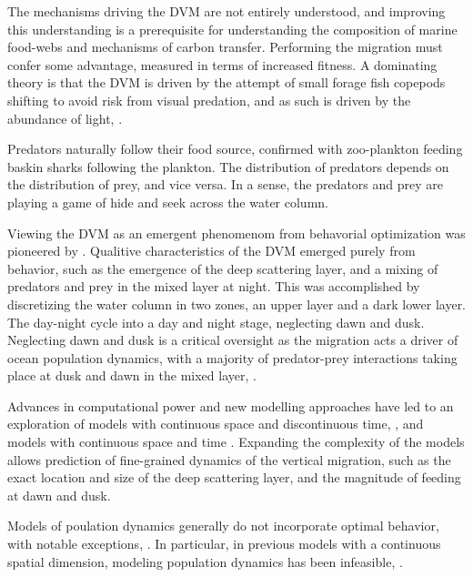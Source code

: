 The mechanisms driving the DVM are not entirely understood, and improving this understanding is a prerequisite for understanding the composition of marine food-webs and mechanisms of carbon transfer. Performing the migration must confer some advantage, measured in terms of increased fitness. A dominating theory is that the DVM is driven by the attempt of small forage fish copepods shifting to avoid risk from visual predation, and as such is driven by the abundance of light, \citep{nilsson2003vertical}.

Predators naturally follow their food source, confirmed \citep{sims2005habitat} with zoo-plankton feeding baskin sharks following the plankton. The distribution of predators depends on the distribution of prey, and vice versa. In a sense, the predators and prey are playing a game of hide and seek across the water column.


Viewing the DVM as an emergent phenomenom from behavorial optimization was pioneered by \citep{iwasa1982vertical}. Qualitive characteristics of the DVM emerged purely from behavior, such as the emergence of the deep scattering layer, and a mixing of predators and prey in the mixed layer at night. This was accomplished by discretizing the water column in two zones, an upper layer and a dark lower layer. The day-night cycle into a day and night stage, neglecting dawn and dusk. Neglecting dawn and dusk is a critical oversight as the migration acts  a driver of ocean population dynamics, with a majority of predator-prey interactions taking place at dusk and dawn in the mixed layer, \citep{benoit2014critical}.

Advances in computational power and new modelling approaches have led to an exploration of models with continuous space and discontinuous time, \citep{jerome}, and models with continuous space and time \citep{verticalmigration}.
Expanding the complexity of the models allows prediction of fine-grained dynamics of the vertical migration, such as the exact location and size of the deep scattering layer, and the magnitude of feeding at dawn and dusk.

Models of poulation dynamics generally do not incorporate optimal behavior, with notable exceptions, \citep{Krivan1998,genkai2007macrophyte}. In particular, in previous models with a continuous spatial dimension, modeling population dynamics has been infeasible, \citep{pinti2019trophic}.


